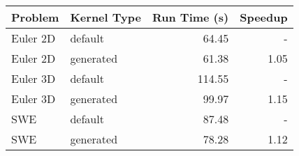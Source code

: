 \begin{tabular}{llrr}
\toprule
Problem & Kernel Type & Run Time (s) & Speedup \\
\midrule
 Euler 2D &  default & 64.45 & - \\
 Euler 2D &  generated & 61.38 & 1.05 \\
 Euler 3D &  default & 114.55 & - \\
 Euler 3D &  generated & 99.97 & 1.15 \\
 SWE &  default & 87.48 & - \\
 SWE &  generated & 78.28 & 1.12 \\
\bottomrule
\end{tabular}
